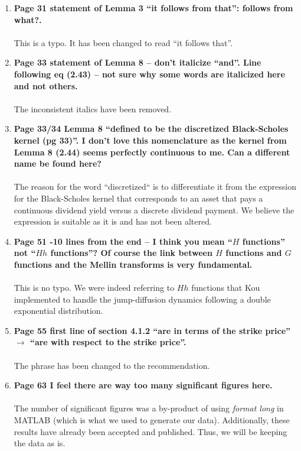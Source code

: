 \documentclass{article}
\begin{document}
\begin{enumerate}
      \item \textbf{Page 31 statement of Lemma 3 ``it follows from that'': follows from what?.
    \\
    \\}
    This is a typo. It has been changed to read ``it follows that''.
    \item
     \textbf{Page 33 statement of Lemma 8 -- don't italicize ``and''. Line following eq (2.43) -- not sure why some words are italicized here and not others.
    \\
    \\}
    The inconsistent italics have been removed.
    \item \textbf{Page 33/34 Lemma 8 ``defined to be the discretized Black-Scholes kernel (pg 33)''. I don't love this nomenclature as the kernel from Lemma 8 (2.44) seems perfectly continuous to me. Can a different name be found here?
    \\
    \\}
    The reason for the word ``discretized`` is to differentiate it from the expression for the Black-Scholes kernel that corresponds to an asset that pays a continuous dividend yield versus a discrete dividend payment. We believe the expression is suitable as it is and has not been altered. 
    
     \item \textbf{Page 51 -10 lines from the end -- I think you mean ``$H$ functions'' not ``$Hh$ functions''? Of course the link between $H$ functions and $G$ functions and the Mellin transforms is very fundamental.
    \\
    \\}
    This is no typo. We were indeed referring to $Hh$ functions that Kou~\cite{Kou2002,Kou2004} implemented to handle the jump-diffusion dynamics following a double exponential distribution.
    
     \item \textbf{Page 55 first line of section 4.1.2 ``are in terms of the strike price'' $\rightarrow$ ``are with respect to the strike price''.
    \\
    \\}
    The phrase has been changed to the recommendation.
    
         \item \textbf{Page 63 I feel there are way too many significant figures here.
    \\
    \\}
    The number of significant figures was a by-product of using \emph{format long} in MATLAB (which is what we used to generate our data). Additionally, these results have already been accepted and published. Thus, we will be keeping the data as is.
    

\end{enumerate}
\end{document}
